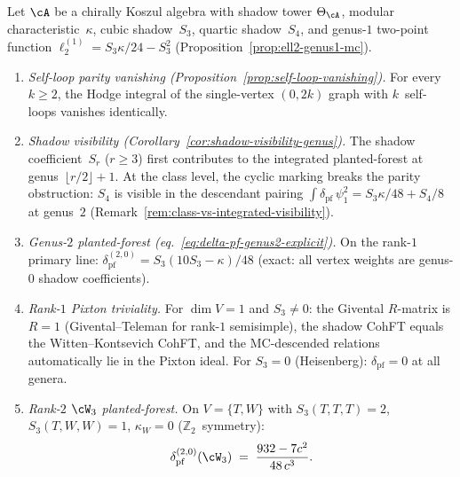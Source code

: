 \begin{theorem}
\label{thm:planted-forest-structure}
\ClaimStatusProvedHere
{}
Let $\cA$ be a chirally Koszul algebra with shadow tower
$\Theta_\cA$, modular characteristic~$\kappa$,
cubic shadow~$S_3$, quartic shadow~$S_4$,
and genus-$1$ two-point function
$\ell_2^{(1)} = S_3\kappa/24 - S_3^2$
\textup{(}Proposition~\textup{\ref{prop:ell2-genus1-mc}}\textup{)}.
\begin{enumerate}[label=\textup{(\roman*)}]
\item \emph{Self-loop parity vanishing
  \textup{(}Proposition~\textup{\ref{prop:self-loop-vanishing}}\textup{)}.}
  For every $k \geq 2$, the Hodge integral of the single-vertex
  $(0,2k)$ graph with $k$~self-loops vanishes identically.
\item \emph{Shadow visibility
  \textup{(}Corollary~\textup{\ref{cor:shadow-visibility-genus}}\textup{)}.}
  The shadow coefficient~$S_r$ ($r \geq 3$) first contributes to
  the integrated planted-forest at genus~$\lfloor r/2 \rfloor + 1$.
  At the class level, the cyclic marking breaks the parity
  obstruction: $S_4$ is visible in the descendant pairing
  $\int \delta_{\mathrm{pf}}\,\psi_1^2 = S_3\kappa/48 + S_4/8$
  at genus~$2$
  \textup{(}Remark~\textup{\ref{rem:class-vs-integrated-visibility}}\textup{)}.
\item \emph{Genus-$2$ planted-forest
  \textup{(}eq.~\textup{\eqref{eq:delta-pf-genus2-explicit}}\textup{)}.}
  On the rank-$1$ primary line:
  $\delta_{\mathrm{pf}}^{(2,0)} = S_3(10S_3 - \kappa)/48$
  \textup{(exact: all vertex weights are genus-$0$ shadow coefficients)}.
\item \emph{Rank-$1$ Pixton triviality.}
  For $\dim V = 1$ and $S_3 \neq 0$:
  the Givental $R$-matrix is $R = 1$
  \textup{(}Givental--Teleman for rank-$1$ semisimple\textup{)},
  the shadow CohFT equals the Witten--Kontsevich CohFT, and the
  MC-descended relations automatically lie in the Pixton ideal.
  For $S_3 = 0$ \textup{(}Heisenberg\textup{)}:
  $\delta_{\mathrm{pf}} = 0$ at all genera.
\item \emph{Rank-$2$ $\cW_3$ planted-forest.}
  On $V = \{T, W\}$ with $S_3(T,T,T) = 2$,
  $S_3(T,W,W) = 1$, $\kappa_W = 0$ ($\mathbb{Z}_2$~symmetry):
  \begin{equation}\label{eq:w3-planted-forest-genus2}
    \delta_{\mathrm{pf}}^{(2,0)}(\cW_3)
    \;=\;
    \frac{932 - 7c^2}{48\,c^3}.
  \end{equation}

\end{enumerate}
\end{theorem}
